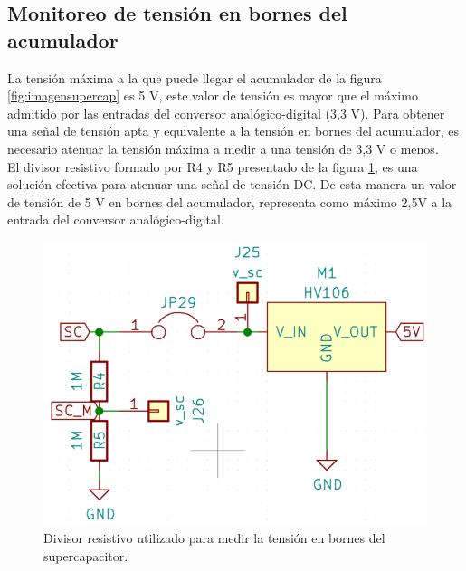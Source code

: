 \subsection{Monitoreo de tensión en bornes del acumulador}
La tensión máxima a la que puede llegar el acumulador de la figura \ref{fig:imagensupercap} es 5 V, este valor de tensión es mayor que el máximo admitido por las entradas del conversor analógico-digital (3,3 V). Para obtener una señal de tensión apta y equivalente a la tensión en bornes del acumulador, es necesario atenuar la tensión máxima a medir a una tensión de 3,3 V o menos.\\
El divisor resistivo formado por R4 y R5 presentado de la figura \ref{fig:ctodivisorresistivo}, es una solución efectiva para atenuar una señal de tensión DC. De esta manera un valor de tensión de 5 V en bornes del acumulador, representa como máximo 2,5V a la entrada del conversor analógico-digital.\\
\begin{figure}[h!]
	\centering
	\includegraphics[width=0.7\linewidth]{Figures/cto_divisor_resistivo}
	\caption{Divisor resistivo utilizado para medir la tensión en bornes del supercapacitor.}
	\label{fig:ctodivisorresistivo}
\end{figure}


